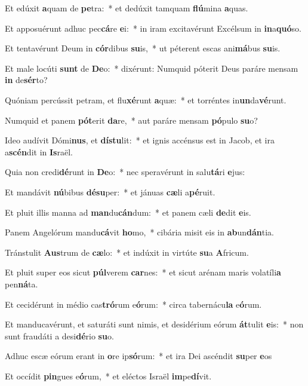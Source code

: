 \item Et edúxit \textbf{a}quam de \textbf{pe}tra:~* et dedúxit tamquam \textbf{flú}mina \textbf{a}quas.
\item Et apposuérunt adhuc pec\textbf{cá}re \textbf{e}i:~* in iram excitavérunt Excélsum in \textbf{in}a\textbf{quó}so.
\item Et tentavérunt Deum in \textbf{cór}dibus \textbf{su}is,~* ut péterent escas ani\textbf{má}bus \textbf{su}is.
\item Et male locúti \textbf{sunt} de \textbf{De}o:~* dixérunt: Numquid póterit Deus paráre mensam \textbf{in} de\textbf{sér}to?
\item Quóniam percússit petram, et flu\textbf{xé}runt \textbf{a}quæ:~* et torréntes in\textbf{un}da\textbf{vé}runt.
\item Numquid et panem \textbf{pót}erit \textbf{da}re,~* aut paráre mensam \textbf{pó}pulo \textbf{su}o?
\item Ideo audívit Dómi\textbf{nus}, et \textbf{dís}\textbf{tu}lit:~* et ignis accénsus est in Jacob, et ira a\textbf{scén}dit in \textbf{Is}raël.
\item Quia non credi\textbf{dé}runt in \textbf{De}o:~* nec speravérunt in salu\textbf{tá}ri \textbf{e}jus:
\item Et mandávit \textbf{nú}bibus \textbf{dé}\textbf{su}per:~* et jánuas \textbf{cæ}li a\textbf{pé}ruit.
\item Et pluit illis manna ad \textbf{man}du\textbf{cán}dum:~* et panem cæli \textbf{de}dit \textbf{e}is.
\item Panem Angelórum mandu\textbf{cá}vit \textbf{ho}mo,~* cibária misit eis in \textbf{ab}un\textbf{dán}tia.
\item Tránstulit \textbf{Aus}trum de \textbf{cæ}lo:~* et indúxit in virtúte \textbf{su}a \textbf{A}fricum.
\item Et pluit super eos sicut \textbf{púl}verem \textbf{car}nes:~* et sicut arénam maris volatíli\textbf{a} pen\textbf{ná}ta.
\item Et cecidérunt in médio cas\textbf{tró}rum e\textbf{ó}rum:~* circa tabernácu\textbf{la} e\textbf{ó}rum.
\item Et manducavérunt, et saturáti sunt nimis, et desidérium eórum \textbf{át}tulit \textbf{e}is:~* non sunt fraudáti a desi\textbf{dé}rio \textbf{su}o.
\item Adhuc escæ eórum erant in \textbf{o}re ip\textbf{só}rum:~* et ira Dei ascéndit \textbf{su}per \textbf{e}os
\item Et occídit \textbf{pin}gues e\textbf{ó}rum,~* et eléctos Israël \textbf{im}pe\textbf{dí}vit.
